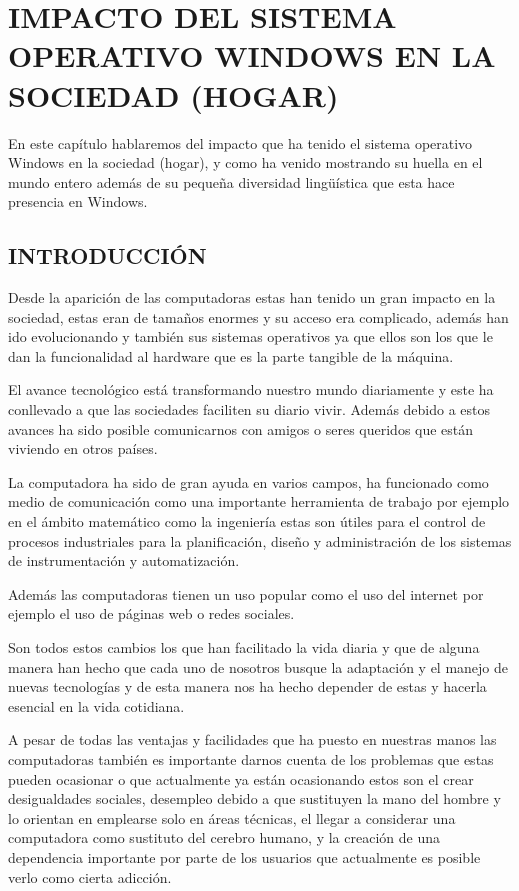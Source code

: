\chapter*{IMPACTO DEL SISTEMA OPERATIVO WINDOWS EN LA SOCIEDAD (HOGAR)}

En este capítulo hablaremos del  impacto que ha tenido el sistema operativo Windows en la sociedad (hogar), y como ha venido mostrando su  huella en el mundo entero además de su 
pequeña diversidad lingüística que esta hace presencia en Windows.

\section*{INTRODUCCIÓN}
Desde la aparición de las computadoras estas han tenido un gran impacto en la sociedad, estas eran de tamaños enormes y su acceso era complicado, además han ido 
evolucionando y también sus sistemas operativos ya que ellos son los que le dan la funcionalidad al hardware que es la parte tangible de la máquina.

El avance tecnológico está transformando nuestro mundo diariamente y este ha conllevado a que las sociedades faciliten su diario vivir. Además debido a estos avances ha 
sido posible comunicarnos con amigos o seres queridos que están viviendo en otros países.

La computadora ha sido de gran ayuda en varios campos, ha funcionado como medio de comunicación como una importante herramienta de trabajo por ejemplo en el ámbito 
matemático como la ingeniería estas son útiles para el control de procesos industriales para la planificación, diseño y administración de los sistemas de instrumentación y 
automatización.
 
Además las computadoras tienen un uso popular como el uso del internet por ejemplo el uso de páginas web o redes sociales.

Son todos estos cambios los que han facilitado la vida diaria y que de alguna manera han hecho que cada uno de nosotros busque la adaptación y el manejo de nuevas 
tecnologías y de esta manera nos ha hecho depender de estas y hacerla esencial en la vida cotidiana.

A pesar de todas las ventajas y facilidades que ha puesto en nuestras manos las computadoras también es importante darnos cuenta de los problemas que estas pueden ocasionar 
o que actualmente ya están ocasionando estos son el crear desigualdades sociales, desempleo debido a que sustituyen la mano del hombre y lo orientan en emplearse solo en 
áreas técnicas, el llegar a considerar una computadora como sustituto del cerebro humano, y la creación de una dependencia importante por parte de los usuarios que 
actualmente es posible verlo como cierta adicción.



